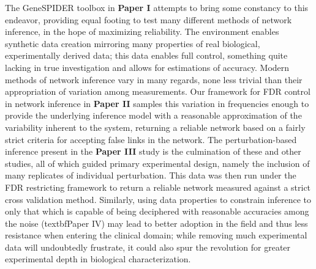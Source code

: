 The GeneSPIDER toolbox in \textbf{Paper I} attempts to bring some constancy to this endeavor, providing equal footing to test many different methods of network inference, in the hope of maximizing reliability. The environment enables synthetic data creation mirroring many properties of real biological, experimentally derived data; this data enables full control, something quite lacking in true investigation and allows for estimations of accuracy. Modern methods of network inference vary in many regards, none less trivial than their appropriation of variation among measurements. Our framework for FDR control in network inference in \textbf{Paper II} samples this variation in frequencies enough to provide the underlying inference model with a reasonable approximation of the variability inherent to the system, returning a reliable network based on a fairly strict criteria for accepting false links in the network. The perturbation-based inference present in the \textbf{Paper III} study is the culmination of these and other studies, all of which guided primary experimental design, namely the inclusion of many replicates of individual perturbation. This data was then run under the FDR restricting framework to return a reliable network measured against a strict cross validation method. Similarly, using data properties to constrain inference to only that which is capable of being deciphered with reasonable accuracies among the noise (textbf{Paper IV}) may lead to better adoption in the field and thus less resistance when entering the clinical domain; while removing much experimental data will undoubtedly frustrate, it could also spur the revolution for greater experimental depth in biological characterization.%
\\








